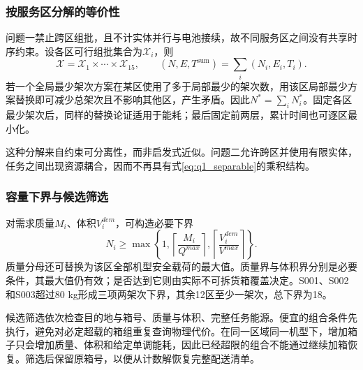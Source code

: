 \subsubsection{按服务区分解的等价性}
问题一禁止跨区组批，且不计实体并行与电池接续，故不同服务区之间没有共享时序约束。设各区可行组批集合为$\mathcal X_i$，则
\begin{equation}
\mathcal X=\mathcal X_1\times\cdots\times\mathcal X_{15},\qquad
(N,E,T^{\mathrm{sum}})=\sum_i(N_i,E_i,T_i).
\label{eq:q1_separable}
\end{equation}
若一个全局最少架次方案在某区使用了多于局部最少的架次数，用该区局部最少方案替换即可减少总架次且不影响其他区，产生矛盾。因此$N^*=\sum_iN_i^*$。固定各区最少架次后，同样的替换论证适用于能耗；最后固定前两层，累计时间也可逐区最小化。

这种分解来自约束可分离性，而非启发式近似。问题二允许跨区并使用有限实体，任务之间出现资源耦合，因而不再具有式\eqref{eq:q1_separable}的乘积结构。

\subsubsection{容量下界与候选筛选}
对需求质量$M_i$、体积$V_i^{dem}$，可构造必要下界
\begin{equation}
N_i\ge\max\left\{1,\left\lceil\frac{M_i}{Q^{max}}\right\rceil,
\left\lceil\frac{V_i^{dem}}{V^{max}}\right\rceil\right\}.
\label{eq:q1_capacity_lower}
\end{equation}
质量分母还可替换为该区全部机型安全载荷的最大值。质量界与体积界分别是必要条件，其最大值仍有效；是否达到它则由实际不可拆货箱覆盖决定。S001、S002和S003超过80 kg形成三项两架次下界，其余12区至少一架次，总下界为18。

候选筛选依次检查目的地与箱号、质量与体积、完整任务能源。便宜的组合条件先执行，避免对必定超载的箱组重复查询物理代价。在同一区域同一机型下，增加箱子只会增加质量、体积和给定单调能耗，因此已经超限的组合不能通过继续加箱恢复。筛选后保留原箱号，以便从计数解恢复完整配送清单。
